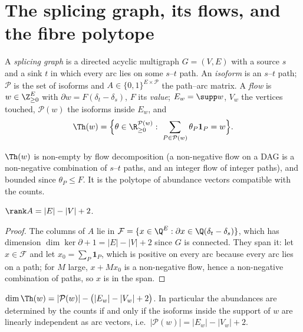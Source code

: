 \section{The splicing graph, its flows, and the fibre polytope}\label{ch17:sec:dim}

\begin{definition}
A \emph{splicing graph} is a directed acyclic multigraph $G=(V,E)$ with a source $s$ and a
sink $t$ in which every arc lies on some $s$--$t$ path. An \emph{isoform} is an $s$--$t$
path; $\mathcal P$ is the set of isoforms and $A\in\{0,1\}^{E\times\mathcal P}$ the
path--arc matrix. A \emph{flow} is $w\in\Z^E_{\ge0}$ with $\partial w=F(\delta_t-\delta_s)$,
$F$ its \emph{value}; $E_w=\supp w$, $V_w$ the vertices touched, $\mathcal P(w)$ the isoforms
inside $E_w$, and
\[
  \Th(w)=\Big\{\theta\in\R_{\ge0}^{\mathcal P(w)}:\ \sum_{P\in\mathcal P(w)}\theta_P\mathbf 1_P=w\Big\}.
\]
\end{definition}

$\Th(w)$ is non-empty by flow decomposition (a non-negative flow on a DAG is a non-negative
combination of $s$--$t$ paths, and an integer flow of integer paths), and bounded since
$\theta_P\le F$. It is the polytope of abundance vectors compatible with the counts.

\begin{lemma}\label{ch17:lem:rank}
$\rank A=|E|-|V|+2$.
\end{lemma}

\begin{proof}
The columns of $A$ lie in $\mathcal F=\{x\in\Q^E:\partial x\in\Q(\delta_t-\delta_s)\}$,
which has dimension $\dim\ker\partial+1=|E|-|V|+2$ since $G$ is connected. They span it:
let $x\in\mathcal F$ and let $x_0=\sum_P\mathbf 1_P$, which is positive on every arc because
every arc lies on a path; for $M$ large, $x+Mx_0$ is a non-negative flow, hence a
non-negative combination of paths, so $x$ is in the span.
\end{proof}

\begin{theorem}\label{ch17:thm:dim}
$\dim\Th(w)=|\mathcal P(w)|-\big(|E_w|-|V_w|+2\big)$. In particular the abundances are
determined by the counts if and only if the isoforms inside the support of $w$ are linearly
independent as arc vectors, i.e.\ $|\mathcal P(w)|=|E_w|-|V_w|+2$.
\end{theorem}

